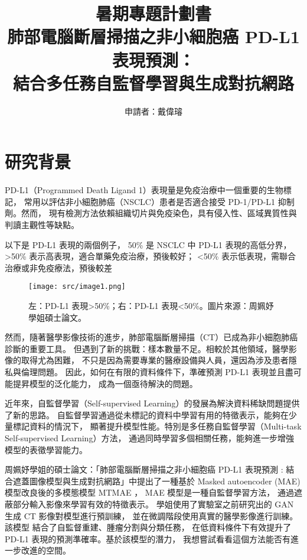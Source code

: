 \documentclass[12pt,a4paper]{article}
\title{暑期專題計劃書\\\large 肺部電腦斷層掃描之非小細胞癌 PD-L1 表現預測：\\結合多任務自監督學習與生成對抗網路}
\author{申請者：戴偉璿}
\begin{document}

\maketitle

\newpage

\section{研究背景}
PD-L1（Programmed Death Ligand 1）表現量是免疫治療中一個重要的生物標記，
常用以評估非小細胞肺癌（NSCLC）患者是否適合接受 PD-1/PD-L1 抑制劑。然而，
現有檢測方法依賴組織切片與免疫染色，具有侵入性、區域異質性與判讀主觀性等缺點。

以下是 PD-L1 表現的兩個例子，
50\% 是 NSCLC 中 PD-L1 表現的高低分界，>50\% 表示高表現，適合單藥免疫治療，預後較好；
<50\% 表示低表現，需聯合治療或非免疫療法，預後較差
\begin{figure}[h]
  \centering
  \texttt{[image: src/image1.png]}
  \centering
  \caption{左：PD-L1 表現>50\%；右：PD-L1 表現<50\%。圖片來源：周姵妤學姐碩士論文。}
  \label{fig:pdl1-examples}
\end{figure}

然而，隨著醫學影像技術的進步，肺部電腦斷層掃描（CT）已成為非小細胞肺癌診斷的重要工具。
但遇到了新的挑戰：樣本數量不足。相較於其他領域，醫學影像的取得尤為困難，
不只是因為需要專業的醫療設備與人員，還因為涉及患者隱私與倫理問題。
因此，如何在有限的資料條件下，準確預測 PD-L1 表現並且盡可能提昇模型的泛化能力，
成為一個亟待解決的問題。

近年來，自監督學習（Self-supervised Learning）的發展為解決資料稀缺問題提供了新的思路。
自監督學習通過從未標記的資料中學習有用的特徵表示，能夠在少量標記資料的情況下，
顯著提升模型性能。特別是多任務自監督學習（Multi-task Self-supervised Learning）方法，
通過同時學習多個相關任務，能夠進一步增強模型的表徵學習能力。

周姵妤學姐的碩士論文：「肺部電腦斷層掃描之非小細胞癌 PD-L1 表現預測 :
結合遮蓋圖像模型與生成對抗網路」中提出了一種基於 Masked autoencoder (MAE)
模型改良後的多模態模型 MTMAE ， MAE 模型是一種自監督學習方法，
通過遮蔽部分輸入影像來學習有效的特徵表示。
學姐使用了實驗室之前研究出的 GAN 生成 CT 影像對模型進行預訓練，
並在微調階段使用真實的醫學影像進行訓練。該模型
結合了自監督重建、腫瘤分割與分類任務，
在低資料條件下有效提升了 PD-L1 表現的預測準確率。基於該模型的潛力，
我想嘗試看看這個方法能否有進一步改進的空間。
\end{document}
